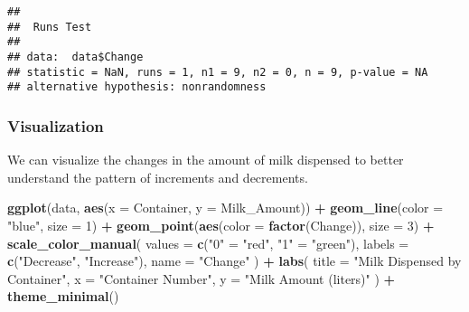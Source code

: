 \documentclass[
]{article}
\newenvironment{Shaded}{\begin{snugshade}}{\end{snugshade}}
\newcommand{\AttributeTok}[1]{\textcolor[rgb]{0.13,0.29,0.53}{#1}}
\newcommand{\CommentTok}[1]{\textcolor[rgb]{0.56,0.35,0.01}{\textit{#1}}}
\newcommand{\DecValTok}[1]{\textcolor[rgb]{0.00,0.00,0.81}{#1}}
\newcommand{\FunctionTok}[1]{\textcolor[rgb]{0.13,0.29,0.53}{\textbf{#1}}}
\newcommand{\NormalTok}[1]{#1}
\newcommand{\OtherTok}[1]{\textcolor[rgb]{0.56,0.35,0.01}{#1}}
\newcommand{\SpecialCharTok}[1]{\textcolor[rgb]{0.81,0.36,0.00}{\textbf{#1}}}
\newcommand{\StringTok}[1]{\textcolor[rgb]{0.31,0.60,0.02}{#1}}
\begin{document}
\begin{Shaded}
\end{Shaded}

\begin{verbatim}
## 
##  Runs Test
## 
## data:  data$Change
## statistic = NaN, runs = 1, n1 = 9, n2 = 0, n = 9, p-value = NA
## alternative hypothesis: nonrandomness
\end{verbatim}

\subsubsection{Visualization}\label{visualization-2}

We can visualize the changes in the amount of milk dispensed to better
understand the pattern of increments and decrements.

\begin{Shaded}
\begin{Highlighting}[]
\FunctionTok{ggplot}\NormalTok{(data, }\FunctionTok{aes}\NormalTok{(}\AttributeTok{x =}\NormalTok{ Container, }\AttributeTok{y =}\NormalTok{ Milk\_Amount)) }\SpecialCharTok{+}
  \FunctionTok{geom\_line}\NormalTok{(}\AttributeTok{color =} \StringTok{"blue"}\NormalTok{, }\AttributeTok{size =} \DecValTok{1}\NormalTok{) }\SpecialCharTok{+}
  \FunctionTok{geom\_point}\NormalTok{(}\FunctionTok{aes}\NormalTok{(}\AttributeTok{color =} \FunctionTok{factor}\NormalTok{(Change)), }\AttributeTok{size =} \DecValTok{3}\NormalTok{) }\SpecialCharTok{+}
  \FunctionTok{scale\_color\_manual}\NormalTok{(}
    \AttributeTok{values =} \FunctionTok{c}\NormalTok{(}\StringTok{"0"} \OtherTok{=} \StringTok{"red"}\NormalTok{, }\StringTok{"1"} \OtherTok{=} \StringTok{"green"}\NormalTok{),}
    \AttributeTok{labels =} \FunctionTok{c}\NormalTok{(}\StringTok{"Decrease"}\NormalTok{, }\StringTok{"Increase"}\NormalTok{),}
    \AttributeTok{name =} \StringTok{"Change"}
\NormalTok{  ) }\SpecialCharTok{+}
  \FunctionTok{labs}\NormalTok{(}
    \AttributeTok{title =} \StringTok{"Milk Dispensed by Container"}\NormalTok{,}
    \AttributeTok{x =} \StringTok{"Container Number"}\NormalTok{,}
    \AttributeTok{y =} \StringTok{"Milk Amount (liters)"}
\NormalTok{  ) }\SpecialCharTok{+}
  \FunctionTok{theme\_minimal}\NormalTok{()}
\end{Highlighting}
\end{Shaded}
\end{document}
